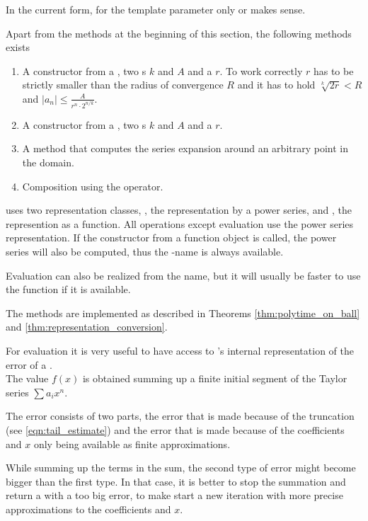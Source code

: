 	  In the current form, for the template parameter  only \real or \complex makes sense. 
		
		Apart from the methods at the beginning of this section, the following methods exists
		\begin{enumerate}
			\item A constructor from a \powerseries, two s $k$ and $A$ and a  $r$.
			To work correctly $r$ has to be strictly smaller than the radius of convergence $R$ 
			and it has to hold $\sqrt[k]{2r} < R$ and $|a_n| \leq \frac{A}{r^n \cdot 2^{n/k}}$.
			\item A constructor from a \func, two s $k$ and $A$ and a  $r$.
			\item A method  that computes the series expansion around
			an arbitrary point in the domain.
			\item Composition using the \code{()} operator.
		\end{enumerate}
		
		\baana uses two representation classes, , the representation by a power series, and , the represention as a function. 
		All operations except evaluation use the power series representation. 
		If the constructor from a function object is called, the power series will also be computed, 
		thus the -name is always available.

		Evaluation can also be realized from the  name, but it will usually be faster 
		to use the function if it is available.

    The methods are implemented as described in Theorems \ref{thm:polytime_on_ball} and \ref{thm:representation_conversion}. 

    For evaluation it is very useful to have access to {\irram}'s internal representation of the error of a \real. \\
    The value $f(x)$ is obtained summing up a finite initial segment of the Taylor series $ \sum a_i x^n $.

    The error consists of two parts, the error that is made because of the truncation (see \ref{eqn:tail_estimate}) and 
    the error that is made because of the coefficients and $x$ only being available as finite approximations. 
    
    While summing up the terms in the sum, the second type of error might become bigger than the first type.
    In that case, it is better to stop the summation and return a \real with a too big error, to make \irram start a new 
    iteration with more precise approximations to the coefficients and $x$.
   
